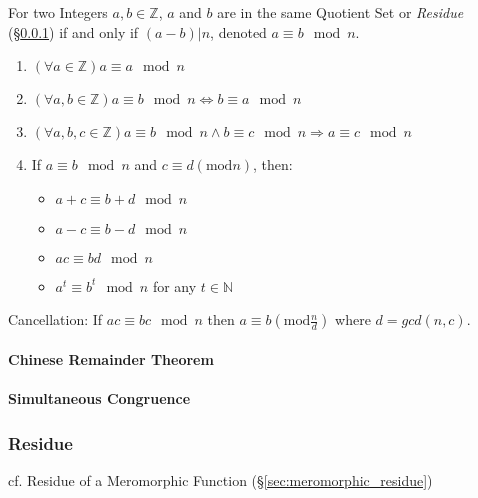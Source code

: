 For two Integers $a,b \in \mathbb{Z}$, $a$ and $b$ are in the same
Quotient Set or \emph{Residue} (\S\ref{sec:residue}) if and only if
$(a - b)|n$, denoted $a \equiv b \mod n$.

\begin{enumerate}

  \item $(\forall a \in \mathbb{Z}) a \equiv a \mod n$

  \item $(\forall a,b \in \mathbb{Z}) a \equiv b \mod n
    \Leftrightarrow b \equiv a \mod n$

  \item $(\forall a,b,c \in \mathbb{Z}) a \equiv b \mod n
    \wedge b \equiv c \mod n \Rightarrow a \equiv c
    \mod n$

  \item
    If $a \equiv b \mod n$ and $c \equiv d (\mathrm{mod }
    n)$, then:
    \begin{itemize}
    \item $a + c \equiv b + d \mod n$
    \item $a - c \equiv b - d \mod n$
    \item $ac \equiv bd \mod n$
    \item $a^t \equiv b ^t \mod n$ for any $t \in
      \mathbb{N}$
    \end{itemize}

\end{enumerate}

Cancellation: If $ac \equiv bc \mod n$ then $a \equiv b
(\mathrm{mod } \frac{n}{d})$ where $d = gcd(n,c)$.



\paragraph{Chinese Remainder Theorem}\label{sec:chinese_remainder}\hfill

\paragraph{Simultaneous Congruence}\label{sec:simultaneous_congruence}\hfill



\subsubsection{Residue}\label{sec:residue}

\fist cf. Residue of a Meromorphic Function (\S\ref{sec:meromorphic_residue})

